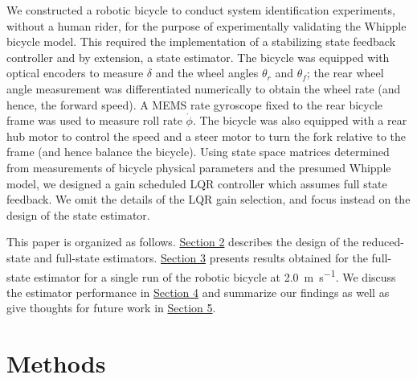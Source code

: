 \documentclass[letterpaper,11pt]{article}
\begin{document}
We constructed a robotic bicycle to conduct system identification experiments,
without a human rider, for the purpose of experimentally validating the Whipple
bicycle model. This required the implementation of a stabilizing state feedback
controller and by extension, a state estimator. The bicycle was equipped with
optical encoders to measure $\delta$ and the wheel angles $\theta_r$ and
$\theta_f$; the rear wheel angle measurement was differentiated numerically to
obtain the wheel rate (and hence, the forward speed). A MEMS rate gyroscope
fixed to the rear bicycle frame was used to measure roll rate $\dot{\phi}$. The
bicycle was also equipped with a rear hub motor to control the speed and a
steer motor to turn the fork relative to the frame (and hence balance the
bicycle). Using state space matrices determined from measurements of bicycle
physical parameters and the presumed Whipple model, we designed a gain
scheduled LQR controller which assumes full state feedback. We omit the details
of the LQR gain selection, and focus instead on the design of the state
estimator.

This paper is organized as follows. \hyperref[sec:methods]{Section 2} describes
the design of the reduced-state and full-state estimators.
\hyperref[sec:results]{Section 3} presents results obtained for the full-state
estimator for a single run of the robotic bicycle at \SI{2.0}{\m\per\s}. We
discuss the estimator performance in \hyperref[sec:discussion]{Section 4} and
summarize our findings as well as give thoughts for future work in
\hyperref[sec:conclusion]{Section 5}.

\section{Methods} \label{sec:methods}
\end{document}
